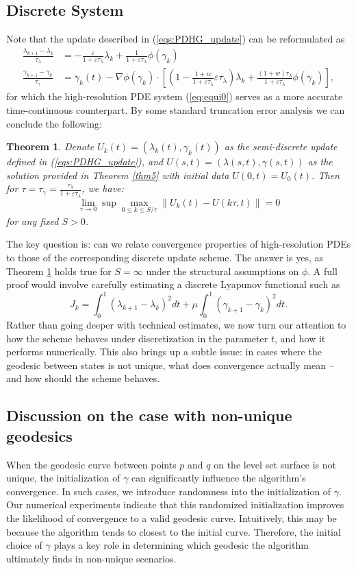 \documentclass[12pt]{amsart}
\newtheorem{theorem}{Theorem}
\theoremstyle{definition}
\theoremstyle{remark}
\numberwithin{equation}{section}
\numberwithin{equation}{section}
\begin{document}
\subsection{Discrete System}
  Note that the update described in (\ref{eqs:PDHG_update}) can be reformulated as 
   \begin{align*}
        \frac{\lambda_{k+1}-\lambda_k}{\tau_{\lambda}} & = -\frac{\varepsilon}{1+\varepsilon\tau_{\lambda}}\lambda_k + \frac{1}{1+\varepsilon\tau_{\lambda}}\phi(\gamma_k)\\
        \frac{\gamma_{k+1}-\gamma_k}{\tau_{\gamma}} & = \ddot{\gamma}_k(t)-\nabla\phi(\gamma_k)\cdot\left[ \left(1-\frac{1+w}{1+\varepsilon \tau_{\lambda}}\varepsilon\tau_{\lambda}\right)\lambda_k+\frac{(1+w)\tau_{\lambda}}{1+\varepsilon\tau_{\lambda}}\phi(\gamma_k) \right],
    \end{align*}   
for which the high-resolution PDE system (\ref{eq:equi0}) serves as a more accurate time-continuous counterpart. By some standard  truncation error analysis we can conclude the following:  
\begin{theorem} \label{thm7}
 Denote $U_k(t) =(\lambda_k(t), \gamma_k(t))$  as the semi-discrete update  defined in (\ref{eqs:PDHG_update}),  and $U(s, t)=(\lambda(s, t),\gamma(s, t))$  as the solution provided in Theorem \ref{thm5} with initial data $U(0, t)=U_0(t)$. Then for $\tau=\tau_\gamma =\frac{\tau_\lambda}{1+ \varepsilon \tau_{\lambda}}$, we have:
$$
\lim_{\tau \to 0} \sup \max_{0\leq k\leq S/\tau}\| U_k(t)-U(k\tau, t)\|=0
$$
for any fixed $S>0$. 
\end{theorem}  
The key question is: can we relate  convergence properties of high-resolution PDEs to those of  the corresponding discrete update scheme. The answer is yes, as Theorem \ref{thm7} holds true for $S=\infty$ under the structural assumptions on $\phi$. A 
full proof would involve carefully estimating a discrete Lyapunov functional such as 
$$
J_k=\int_0^1 (\lambda_{k+1}-\lambda_k)^2 dt +\mu \int_0^1 (\gamma_{k+1}-\gamma_k)^2 dt.
$$
Rather than going deeper with technical estimates, we now turn our attention to how the scheme behaves under discretization in the parameter $t$, and how it performs numerically. This also brings up a subtle issue: in cases where the geodesic between states is not unique, what does convergence actually mean -- and how should the scheme behaves.  


\subsection{Discussion on the case with non-unique geodesics}
When the geodesic curve between points $p$ and $q$ on the level set surface is not unique, the initialization of $\gamma$ can significantly influence  the algorithm's convergence. In such cases, we introduce randomness into the initialization of $\gamma$. Our numerical experiments indicate that this randomized  initialization improves 
the likelihood of convergence to a valid geodesic curve. Intuitively, this may be because the algorithm tends to closest to the initial curve. Therefore, the initial choice of $\gamma$ plays a key role in determining which geodesic the algorithm ultimately finds in non-unique scenarios.
\end{document}
